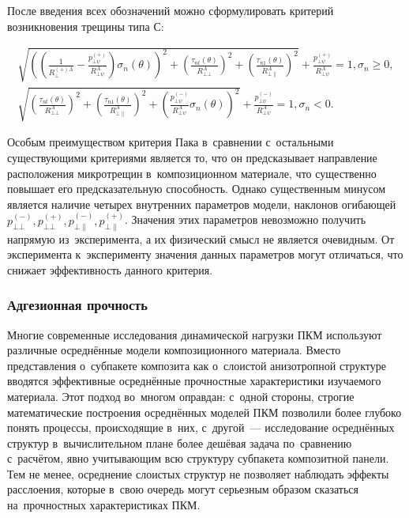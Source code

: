 \documentclass[thesis.tex]{subfiles}
\begin{document}
После введения всех обозначений можно сформулировать критерий возникновения трещины типа $С$:
\begin{small}
\begin{align}
    \sqrt{\left( \left( \frac{1}{R_\bot^{(+)A}}-\frac{p_{\bot\psi}^{(+)}}{R_{\bot\psi}^A} \right) \sigma_n(\theta) \right)^2+
          \left( \frac{\tau_{nt}(\theta)}{R_{\bot\bot}^A} \right)^2+\left( \frac{\tau_{n1}(\theta)}{R_{\bot\|}^A} \right)^2}+
    \frac{p_{\bot\psi}^{(+)}}{R_{\bot\psi}^A}=1, \sigma_n \geq 0, \\
    \sqrt{\left( \frac{\tau_{nt}(\theta)}{R_{\bot\bot}^A} \right)^2+\left( \frac{\tau_{n1}(\theta)}{R_{\bot\|}^A} \right)^2+
          \left( \frac{p_{\bot\psi}^{(-)}}{R_{\bot\psi}^A}\sigma_n(\theta) \right)^2 }+
    \frac{p_{\bot\psi}^{(-)}}{R_{\bot\psi}^A}=1, \sigma_n < 0.
\end{align}
\end{small}

Особым преимуществом критерия Пака в~сравнении с~остальными существующими критериями является то, что он предсказывает
направление расположения микротрещин в~композиционном материале, что существенно повышает его предсказательную способность.
Однако существенным минусом является наличие четырех внутренних параметров модели, наклонов огибающей
$p_{\bot\bot}^{(-)},p_{\bot\bot}^{(+)},p_{\bot\|}^{(-)},p_{\bot\|}^{(+)}$. Значения этих параметров невозможно
получить напрямую из~эксперимента, а их физический смысл не является очевидным. От эксперимента к~эксперименту значения
данных параметров могут отличаться, что снижает эффективность данного критерия.

\subsubsection{Адгезионная прочность}
Многие современные исследования динамической нагрузки ПКМ используют различные осреднённые модели композиционного
материала. Вместо представления о~субпакете композита как о~слоистой анизотропной структуре вводятся эффективные
осреднённые прочностные характеристики изучаемого материала. Этот подход во~многом оправдан: с~одной стороны, строгие
математические построения осреднённых моделей ПКМ позволили более глубоко понять процессы, происходящие в~них, с~другой~---
исследование осреднённых структур в~вычислительном плане более дешёвая задача по~сравнению с~расчётом, явно учитывающим
всю структуру субпакета композитной панели. Тем не менее, осреднение слоистых структур не позволяет наблюдать эффекты
расслоения, которые в~свою очередь могут серьезным образом сказаться на~прочностных характеристиках ПКМ.
\end{document}
